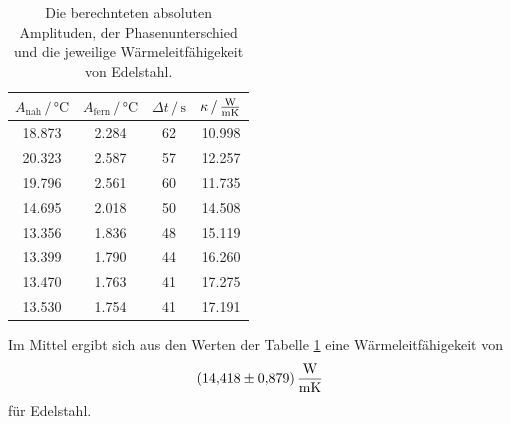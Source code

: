 \begin{table}
\centering
\caption{Die berechnteten absoluten Amplituden, der Phasenunterschied und die jeweilige Wärmeleitfähigekeit von Edelstahl.}
\begin{tabular}{cccc}
    \toprule
    $A_\text{nah} \,/\, \si{\celsius}$ & $A_\text{fern} \,/\, \si{\celsius}$ & $\Delta t \,/\, \si{\second}$ & $\kappa \, / \, \si{\frac{\watt}{\meter\kelvin}}$ \\
    \midrule
    18.873 & 2.284 & 62 & 10.998 \\
    20.323 & 2.587 & 57 & 12.257 \\
    19.796 & 2.561 & 60 & 11.735 \\
    14.695 & 2.018 & 50 & 14.508 \\
    13.356 & 1.836 & 48 & 15.119 \\
    13.399 & 1.790 & 44 & 16.260 \\
    13.470 & 1.763 & 41 & 17.275 \\
    13.530 & 1.754 & 41 & 17.191 \\
    \bottomrule
\end{tabular}
\label{tab:erg_edel}
\end{table}

Im Mittel ergibt sich aus den Werten der Tabelle \ref{tab:erg_edel} eine Wärmeleitfähigekeit von
\begin{equation*}
    \SI{14.418(879)}{\frac{\watt}{\meter\kelvin}}
\end{equation*} 
für Edelstahl.

